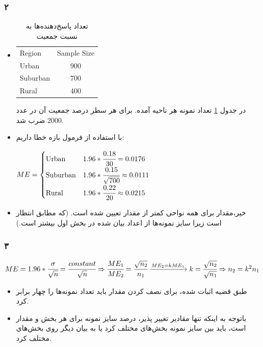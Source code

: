 \documentclass[12pt]{article}
\begin{document}
\subsubsection{۲}
\begin{itemize}
	\item 
	
	\begin{table}[ht]
		\centering
		\caption{تعداد پاسخ‌دهنده‌ها به نسبت جمعیت}
		\label{tab:q6_1_2}
		\begin{latin}
			
			
			\begin{tabular}{l c}
				Region & Sample Size \\
				Urban & 900 \\
				Suburban & 700 \\
				Rural & 400 
			\end{tabular}
		\end{latin}
	\end{table}
	در جدول \ref{tab:q6_1_2} تعداد نمونه هر ناحیه آمده. برای هر سطر درصد جمعیت آن در عدد 
	$2000$
	ضرب شد.
	\item 
	با استفاده از فرمول بازه خطا داریم:
	\begin{latin}
		$
		ME = \begin{cases}
			\text{Urban} & 1.96 * \cfrac{0.18}{30} = 0.0176 \\
			\text{Suburban} & 1.96 * \cfrac{0.15}{\sqrt{700}} \approx 0.0111 \\ 
			\text{Rural} & 1.96 * \cfrac{0.22}{20} \approx 0.0215\\
		\end{cases}
		$
	\end{latin}
	\item 
	خیر،‌مقدار  برای همه نواحی کمتر از مقدار تعیین شده است. (که مطابق انتظار است زیرا سایز نمونه‌ها از اعداد بیان شده در بخش اول بیشتر است.)

\end{itemize}
\subsubsection{۳}
\begin{latin}
	$
	ME = 1.96 * \cfrac{\sigma}{\sqrt{n}} = \cfrac{constant}{\sqrt{n}} \Rightarrow \cfrac{ME_1}{ME_2} = \cfrac{\sqrt{n_2}}{n_1} \xrightarrow{ME_2 = kME_1} k = \cfrac{\sqrt{n_2}}{\sqrt{n_1}}  \Rightarrow n_2 = k^2 n_1
	$
\end{latin}
\begin{itemize}
	\item 
	طبق قضیه اثبات شده، برای نصف کردن مقدار 
	باید تعداد نمونه‌ها را چهار برابر کرد.
	\item 
	باتوجه به اینکه تنها مقادیر تغییر پذیر، درصد سایز نمونه برای هر بخش و مقدار 
	است،‌ باید بین سایز نمونه بخش‌های مختلف 
	کرد یا به بیان دیگر روی 
	بخش‌های مختلف 
	کرد.
\end{itemize}
\end{document}
